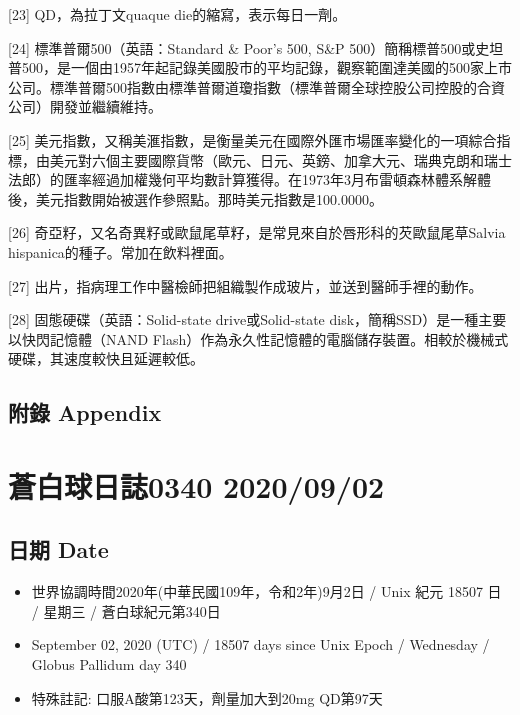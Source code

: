 \documentclass[a5paper, 11pt
]{book}
\providecommand{\tightlist}{%
  \setlength{\itemsep}{0pt}\setlength{\parskip}{0pt}}
\begin{document}
{[}23{]} QD，為拉丁文quaque die的縮寫，表示每日一劑。

{[}24{]} 標準普爾500（英語：Standard \& Poor's 500, S\&P
500）簡稱標普500或史坦普500，是一個由1957年起記錄美國股市的平均記錄，觀察範圍達美國的500家上市公司。標準普爾500指數由標準普爾道瓊指數（標準普爾全球控股公司控股的合資公司）開發並繼續維持。

{[}25{]}
美元指數，又稱美滙指數，是衡量美元在國際外匯市場匯率變化的一項綜合指標，由美元對六個主要國際貨幣（歐元、日元、英鎊、加拿大元、瑞典克朗和瑞士法郎）的匯率經過加權幾何平均數計算獲得。在1973年3月布雷頓森林體系解體後，美元指數開始被選作參照點。那時美元指數是100.0000。

{[}26{]}
奇亞籽，又名奇異籽或歐鼠尾草籽，是常見來自於唇形科的芡歐鼠尾草Salvia
hispanica的種子。常加在飲料裡面。

{[}27{]}
出片，指病理工作中醫檢師把組織製作成玻片，並送到醫師手裡的動作。

{[}28{]} 固態硬碟（英語：Solid-state drive或Solid-state
disk，簡稱SSD）是一種主要以快閃記憶體（NAND
Flash）作為永久性記憶體的電腦儲存裝置。相較於機械式硬碟，其速度較快且延遲較低。

\hypertarget{ux9644ux9304-appendix}{%
\subsection{附錄 Appendix}\label{ux9644ux9304-appendix}}

\hypertarget{ux84bcux767dux7403ux65e5ux8a8c0340-20200902}{%
\section{蒼白球日誌0340
2020/09/02}\label{ux84bcux767dux7403ux65e5ux8a8c0340-20200902}}

\hypertarget{ux65e5ux671f-date-1}{%
\subsection{日期 Date}\label{ux65e5ux671f-date-1}}

\begin{itemize}
\tightlist
\item
  世界協調時間2020年(中華民國109年，令和2年)9月2日 / Unix 紀元 18507 日
  / 星期三 / 蒼白球紀元第340日
\item
  September 02, 2020 (UTC) / 18507 days since Unix Epoch / Wednesday /
  Globus Pallidum day 340
\item
  特殊註記: 口服A酸第123天，劑量加大到20mg QD第97天
\end{itemize}
\end{document}
